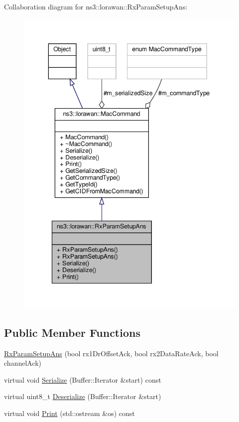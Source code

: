 Collaboration diagram for ns3\+:\+:lorawan\+:\+:Rx\+Param\+Setup\+Ans\+:
\nopagebreak
\begin{figure}[H]
\begin{center}
\leavevmode
\includegraphics[width=343pt]{classns3_1_1lorawan_1_1RxParamSetupAns__coll__graph}
\end{center}
\end{figure}
\subsection*{Public Member Functions}
\begin{DoxyCompactItemize}
\item 
\hyperlink{classns3_1_1lorawan_1_1RxParamSetupAns_ae03f7bb0e7e329a7a444f084744af037}{Rx\+Param\+Setup\+Ans} (bool rx1\+Dr\+Offset\+Ack, bool rx2\+Data\+Rate\+Ack, bool channel\+Ack)
\item 
virtual void \hyperlink{classns3_1_1lorawan_1_1RxParamSetupAns_af6250c20e44bc56a75d6b5cd9fdcbf0d}{Serialize} (Buffer\+::\+Iterator \&start) const
\item 
virtual uint8\+\_\+t \hyperlink{classns3_1_1lorawan_1_1RxParamSetupAns_a947a969469c7f9df3819b6359193258e}{Deserialize} (Buffer\+::\+Iterator \&start)
\item 
virtual void \hyperlink{classns3_1_1lorawan_1_1RxParamSetupAns_a1972e0a8577118a86e15545e93d4460e}{Print} (std\+::ostream \&os) const
\end{DoxyCompactItemize}
